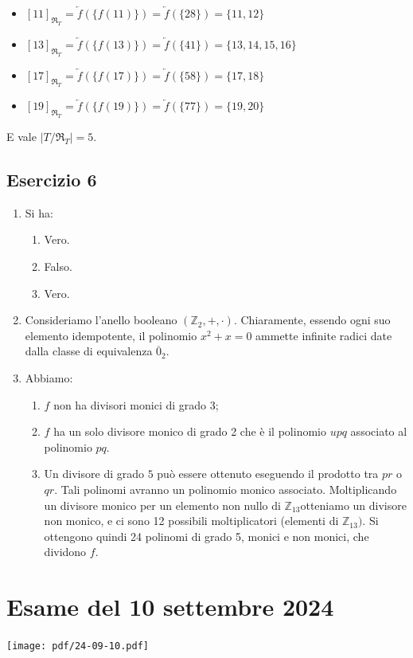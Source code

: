 \begin{enumerate}[label=(\textit{\roman*})]
\begin{itemize}
		\item $[11]_{\mathfrak{R}_{T}}=\overleftarrow{f}(\{f(11)\}) = \overleftarrow{f}(\{28\}) = \{11,12\}$
		\item $[13]_{\mathfrak{R}_{T}}=\overleftarrow{f}(\{f(13)\}) = \overleftarrow{f}(\{41\}) = \{13,14,15,16\}$
		\item $[17]_{\mathfrak{R}_{T}}=\overleftarrow{f}(\{f(17)\}) = \overleftarrow{f}(\{58\}) = \{17,18\}$
		\item $[19]_{\mathfrak{R}_{T}}=\overleftarrow{f}(\{f(19)\}) = \overleftarrow{f}(\{77\}) = \{19,20\}$
	\end{itemize}
	E vale $|T/{\mathfrak{R}_{T}}|=5$.
\end{enumerate}
\subsection*{Esercizio 6}
\begin{enumerate}[label=(\textit{\roman*})]
	\item Si ha:
	\begin{enumerate}[label=(\arabic*)]
		\item Vero.
		\item Falso.
		\item Vero.
	\end{enumerate}
	\item Consideriamo l'anello booleano $(\mathbb{Z}_{2},+,\cdot)$. Chiaramente, essendo ogni suo elemento idempotente, il polinomio $x^{2}+x=0$ ammette infinite radici date dalla classe di equivalenza $\overline{0}_{2}$.
	\item Abbiamo:
	\begin{enumerate}
		\item $f$ non ha divisori monici di grado 3;
		\item $f$ ha un solo divisore monico di grado 2 che è il polinomio $upq$ associato al polinomio $pq$.
		\item Un divisore di grado $5$ può essere ottenuto eseguendo il prodotto tra $pr$ o $qr$. Tali polinomi avranno un polinomio monico associato. Moltiplicando un divisore monico per un elemento non nullo di $\mathbb{Z}_{13}$​ otteniamo un divisore non monico, e ci sono 12 possibili moltiplicatori (elementi di $\mathbb{Z}_{13})$. Si ottengono quindi 24 polinomi di grado 5, monici e non monici, che dividono $f$.
	\end{enumerate}
\end{enumerate}
\vfill
\section{Esame del 10 settembre 2024}
\begin{center}
	\texttt{[image: pdf/24-09-10.pdf]}
\end{center}
